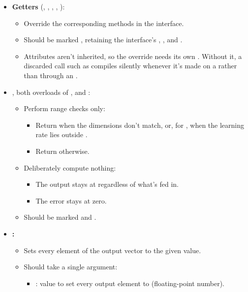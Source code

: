 \begin{itemize}
\begin{itemize}
  \end{itemize}
  \item \textbf{Getters} (, , ,
    , ):
  \begin{itemize}
    \item Override the corresponding methods in the interface.
    \item Should be marked , retaining the interface's \code{[[nodiscard]]},
      , and .
    \item Attributes aren't inherited, so the override needs its own \code{[[nodiscard]]}. Without
      it, a discarded call such as  compiles silently whenever it's made on
      a  rather than through an .
  \end{itemize}
  \item \textbf{}, both overloads of \textbf{}, and
    \textbf{}:
  \begin{itemize}
    \item Perform range checks only:
    \begin{itemize}
      \item Return  when the dimensions don't match, or, for , when
        the learning rate lies outside .
      \item Return  otherwise.
    \end{itemize}
    \item Deliberately compute nothing:
    \begin{itemize}
      \item The output stays at  regardless of what's fed in.
      \item The error stays at zero.
    \end{itemize}
    \item Should be marked  and .
  \end{itemize}
  \item \textbf{:}
  \begin{itemize}
    \item Sets every element of the output vector to the given value.
    \item Should take a single argument:
    \begin{itemize}
      \item {}: value to set every output element to (floating-point number).

\end{itemize}
\end{itemize}
\end{itemize}
